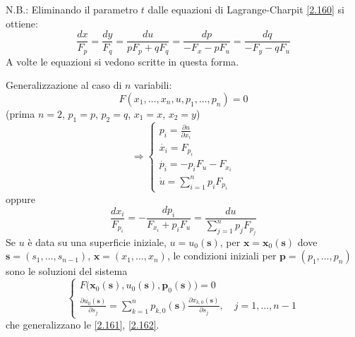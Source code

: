 \documentclass[a4paper,11pt]{report}
\newcommand{\vect}[1]{\boldsymbol{#1}}
\newcommand{\x}{\boldsymbol{x}}
\begin{document}
\medskip

N.B.: Eliminando il parametro $t$ dalle equazioni di Lagrange-Charpit \eqref{2.160} si ottiene:
\begin{equation}
\frac{dx}{F_p}=\frac{dy}{F_q}=\frac{du}{pF_p + qF_q}=\frac{dp}{-F_x - pF_u} = \frac{dq}{-F_y - qF_u} 
\label{2.168}
\end{equation}
A volte le equazioni si vedono scritte in questa forma.

\medskip

Generalizzazione al caso di $n$ variabili:
\begin{equation}
F(x_1,\dots,x_n,u,p_1,\dots,p_n)=0 
\label{2.169}
\end{equation}
(prima $n=2$, $p_1=p$, $p_2=q$, $x_1=x$, $x_2=y$)
\begin{equation}
\Rightarrow \begin{cases}
p_i=\frac{\partial u}{\partial x_i} \\
\dot{x_i} = F_{p_i} \\
\dot{p_i}= - p_i F_u -F_{x_i} \\
\dot{u}=\sum_{i=1}^n p_i F_{p_i}
\end{cases}
\label{2.170}
\end{equation}
oppure 
\[
\frac{dx_i}{F_{p_i}}=-\frac{dp_i}{F_{x_i} + p_iF_u}=\frac{du}{\sum_{j=1}^n p_j F_{p_j}}
\]
Se $u$ \`e data su una superficie iniziale, $u=u_0(\vect{s})$, per $\x = \x_0(\vect{s})$ dove $\vect{s}=(s_1,\dots,s_{n-1})$, 
$\x=(x_1,\dots,x_n)$, le condizioni iniziali per $\vect{p}=(p_1,\dots,p_n)$ sono le soluzioni del sistema
\begin{equation}
\begin{cases}
F \big(\x_0(\vect{s}),u_0(\vect{s}), \vect{p}_0(\vect{s}) \big)=0\\
\frac{\partial u_0(\vect{s})}{\partial s_j}=\sum_{k=1}^n p_{k,0}(\vect{s})\frac{\partial x_{k,0}(\vect{s})}{\partial s_j}, \quad j=1,\dots,n-1
\end{cases} 
\label{2.170'}
\tag{$\theequation'$}
\end{equation}
che generalizzano le \eqref{2.161}, \eqref{2.162}.

\medskip
\end{document}
